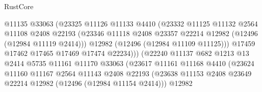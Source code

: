 \begin{lexlean}{RustCore}
\begin{coremodule}
                                    @11135
                                    @33063
                                    (@23325
                                      @11126
                                      @11133
                                      @4410
                                      (@23332
                                        @11125
                                        @11132
                                        @2564
                                        @11108
                                        @2408
                                        @22193
                                        (@23346
                                          @11118
                                          @2408
                                          @23357
                                          @22214
                                          @12982
                                          (@12496 (@12984 @11119 @2414)))
                                        @12982
                                        (@12496 (@12984 @11109 @11125)))
                                      @17459
                                      @17462
                                      @17465
                                      @17469
                                      @17474
                                      @22234)))
                                (@22240
                                  @11137
                                  @682
                                  @1213
                                  @13
                                  @2414
                                  @5735
                                  @11161
                                  @11170
                                  @33063
                                  (@23617
                                    @11161
                                    @11168
                                    @4410
                                    (@23624
                                      @11160
                                      @11167
                                      @2564
                                      @11143
                                      @2408
                                      @22193
                                      (@23638
                                        @11153
                                        @2408
                                        @23649
                                        @22214
                                        @12982
                                        (@12496 (@12984 @11154 @2414)))
                                      @12982

\end{coremodule}
\end{lexlean}
